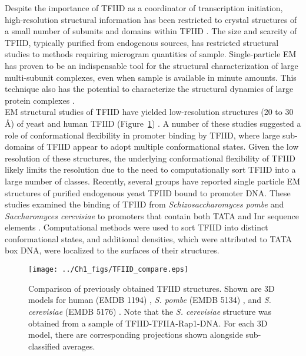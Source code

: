 Despite the importance of TFIID as a coordinator of transcription initiation, high-resolution structural information has been restricted to crystal structures of a small number of subunits and domains within TFIID \cite{Bhattacharya_1103,Jacobson_2160,Kim_3416,Kim_3377,Liu_2574,Werten_1763,Xie_2805}. The size and scarcity of TFIID, typically purified from endogenous sources, has restricted structural studies to methods requiring microgram quantities of sample. Single-particle EM has proven to be an indispensable tool for the structural characterization of large multi-subunit complexes, even when sample is available in minute amounts. This technique also has the potential to characterize the structural dynamics of large protein complexes \cite{Leschziner_883}.\\
\indent EM structural studies of TFIID have yielded low-resolution structures (20 to 30 \AA) of yeast and human TFIID (Figure~\ref{fig:Compare}) \cite{Andel_2407,Brand_2375,Elmlund_691,Grob_1281,Leurent_1797,Leurent_1554,Liu_574,Papai_418,Papai_539}. A number of these studies suggested a role of conformational flexibility in promoter binding by TFIID, where large sub-domains of TFIID appear to adopt multiple conformational states. Given the low resolution of these structures, the underlying conformational flexibility of TFIID likely limits the resolution due to the need to computationally sort TFIID into a large number of classes. Recently, several groups have reported single particle EM structures of purified endogenous yeast TFIID bound to promoter DNA. These studies examined the binding of TFIID from \emph{Schizosaccharomyces pombe} and \emph{Saccharomyces cerevisiae} to promoters that contain both TATA and Inr sequence elements \cite{Elmlund_691,Papai_539}. Computational methods were used to sort TFIID into distinct conformational states, and additional densities, which were attributed to TATA box DNA, were localized to the surfaces of their structures.\\
\begin{figure}
\centering
\texttt{[image: ../Ch1\_figs/TFIID\_compare.eps]}
\caption[Comparison of previously obtained TFIID structures]{Comparison of previously obtained TFIID structures. Shown are 3D models for human (EMDB 1194) \cite{Grob_1281}, \emph{S. pombe} (EMDB 5134) \cite{Elmlund_691}, and \emph{S. cerevisiae} (EMDB 5176) \cite{Papai_539}. Note that the  \emph{S. cerevisiae} structure was obtained from a sample of TFIID-TFIIA-Rap1-DNA. For each 3D model, there are corresponding projections shown alongside sub-classified averages.}
\label{fig:Compare}
\end{figure}
